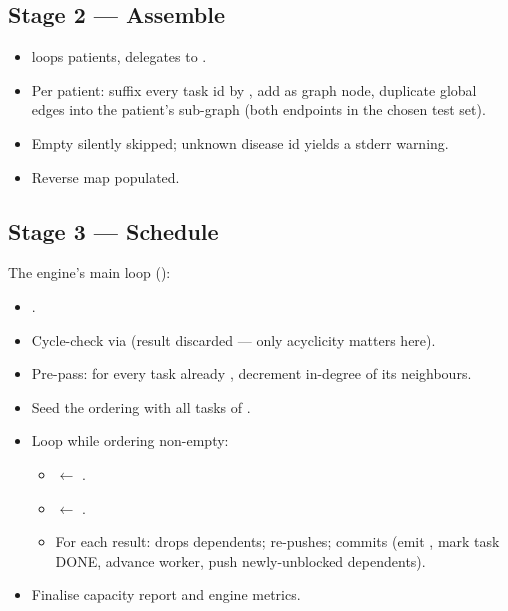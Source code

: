 \subsection{Stage 2 --- Assemble}

\begin{itemize}
  \item {} loops patients, delegates to
        .
  \item Per patient: suffix every task id by
        , add as graph node, duplicate global
        edges into the patient's sub-graph (both endpoints in the
        chosen test set).
  \item Empty  silently skipped; unknown disease
        id yields a stderr warning.
  \item Reverse map  populated.
\end{itemize}

\subsection{Stage 3 --- Schedule}

The engine's main loop ():

\begin{itemize}
  \item {}.
  \item Cycle-check via  (result discarded
        --- only acyclicity matters here).
  \item Pre-pass: for every task already , decrement
        in-degree of its neighbours.
  \item Seed the ordering with all  tasks of
        .
  \item Loop while ordering non-empty:
        \begin{itemize}
          \item {} $\gets$
                .
          \item {} $\gets$
                .
          \item For each result:  drops
                dependents;  re-pushes;
                 commits (emit
                , mark task DONE, advance
                worker, push newly-unblocked dependents).
        \end{itemize}
  \item Finalise capacity report and engine metrics.
\end{itemize}

